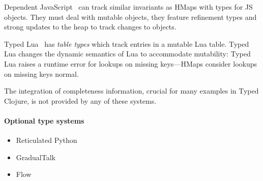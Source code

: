 Dependent JavaScript~\cite{Chugh:2012:DTJ} can track similar
invariants as HMaps with types for JS objects. They must deal with
mutable objects, they feature refinement types and strong updates to
the heap to track changes to objects.

Typed Lua~\cite{Maidl:2014:TLO} has \emph{table types} which track
entries in a mutable Lua table.  Typed Lua changes the dynamic
semantics of Lua to accommodate mutability: Typed Lua raises a runtime
error for lookups on missing keys---HMaps consider lookups on missing
keys normal.

The integration of completeness information, crucial for many examples
in Typed Clojure, is not provided by any of these systems.

\paragraph{Optional type systems}
\begin{itemize}
  \item Reticulated Python~\cite{Vitousek14}
  \item GradualTalk
  \item Flow
\end{itemize}

